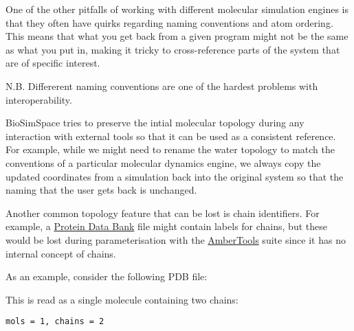 One of the other pitfalls of working with different molecular simulation
engines is that they often have quirks regarding naming conventions and
atom ordering. This means that what you get back from a given program
might not be the same as what you put in, making it tricky to
cross-reference parts of the system that are of specific interest.

N.B. Differerent naming conventions are one of the hardest problems with
interoperability.

BioSimSpace tries to preserve the intial molecular topology during any
interaction with external tools so that it can be used as a consistent
reference. For example, while we might need to rename the water topology
to match the conventions of a particular molecular dynamics engine, we
always copy the updated coordinates from a simulation back into the
original system so that the naming that the user gets back is unchanged.

Another common topology feature that can be lost is chain identifiers.
For example, a \href{https://www.rcsb.org/}{Protein Data Bank} file
might contain labels for chains, but these would be lost during
parameterisation with the
\href{https://ambermd.org/AmberTools.php}{AmberTools} suite since it has
no internal concept of chains.

As an example, consider the following PDB file:

\begin{Shaded}
\begin{Highlighting}[]
\OperatorTok{=}\NormalTok{)}
\end{Highlighting}
\end{Shaded}

This is read as a single molecule containing two chains:

\begin{Shaded}
\begin{Highlighting}[]
\NormalTok{(}\SpecialCharTok{\{}\SpecialCharTok{\}}\SpecialCharTok{\{}\SpecialCharTok{\}}\NormalTok{)}
\end{Highlighting}
\end{Shaded}

\begin{verbatim}
mols = 1, chains = 2
\end{verbatim}

